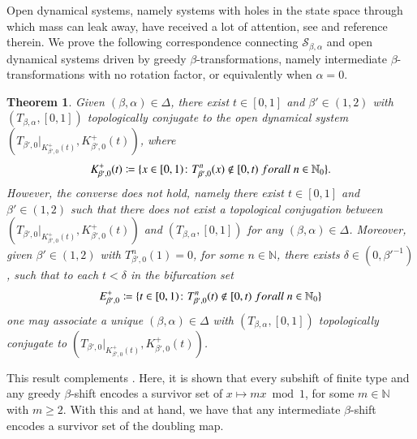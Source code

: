 \documentclass[a4paper,reqno,10pt]{amsart}
\newtheorem{theorem}{Theorem}[section]
\begin{document}
Open dynamical systems, namely systems with holes in the state space through which mass can leak away, have received a lot of attention, see \cite{Ur86,Schme,N09,BBF2014,KKLL} and reference therein.  We prove the following correspondence connecting $\mathcal{S}_{\beta,\alpha}$ and open dynamical systems driven by greedy $\beta$-transformations, namely intermediate $\beta$-transformations with no rotation factor, or equivalently when $\alpha = 0$.

    \begin{theorem}\label{thm:main}
        Given $(\beta, \alpha) \in \Delta$, there exist $t \in [0, 1]$ and $\beta' \in (1, 2)$ with $(T_{\beta, \alpha}, [0, 1])$ topologically conjugate to the open dynamical system $(T_{\beta', 0}\vert_{K^{+}_{\beta',0}(t)}, K^{+}_{\beta',0}(t))$, where 
            \begin{align*}
                K^{+}_{\beta', 0}(t) \coloneqq \{ x \in[0, 1) \colon T_{\beta',0}^{n}(x)\not \in [0,t) \; \textup{for all} \; n \in \mathbb{N}_{0} \}.
            \end{align*}
        However, the converse does not hold, namely there exist $t \in [0, 1]$ and $\beta' \in (1, 2)$ such that there does not exist a topological conjugation between $(T_{\beta', 0}\vert_{K^{+}_{\beta',0}(t)}, K^{+}_{\beta', 0}(t))$ and $(T_{\beta, \alpha}, [0, 1])$ for any $(\beta, \alpha) \in \Delta$. Moreover, given $\beta' \in (1, 2)$ with $T_{\beta',0}^{n}(1) = 0$, for some $n \in \mathbb{N}$, there exists $\delta \in (0, \beta'^{-1})$, such that to each $t < \delta$ in the bifurcation set 
                \begin{align*}
                    E_{\beta',0}^{+} \coloneqq \{ t \in[0,1) \colon T_{\beta', 0}^{n}(t) \not\in [0, t) \; \textup{for all} \; n \in \mathbb{N}_{0} \}
                \end{align*}
        one may associate a unique $(\beta, \alpha) \in \Delta$ with $(T_{\beta, \alpha}, [0, 1])$ topologically conjugate to $(T_{\beta', 0}\vert_{K^{+}_{\beta',0}(t)}, K^{+}_{\beta',0}(t))$.
    \end{theorem}

This result complements \cite[Proposition 3.1 and Theorem 3.5]{bundfuss_kruger_troubetzkoy_2011}. Here, it is shown that every subshift of finite type and any greedy $\beta$-shift encodes a survivor set of $x \mapsto mx \bmod 1$, for some $m \in \mathbb{N}$ with $m \geq 2$.  With this and  at hand, we have that any intermediate $\beta$-shift encodes a survivor set of the doubling map.
\end{document}
